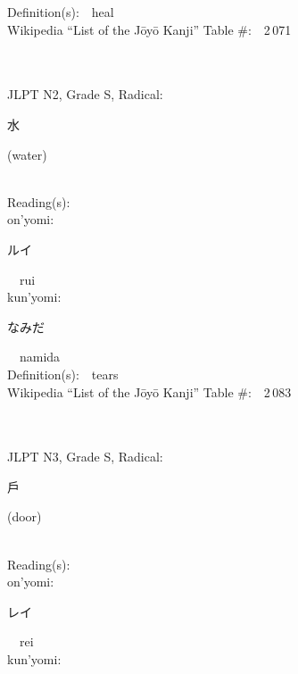 \begin{multicols}{2}
Definition(s):\ \ heal \\
Wikipedia ``List of the J\=oy\=o Kanji'' Table \#:\ \ 2\,071 \\
\ \ \\
{\fontsize{34pt}{40pt}  }\ \ \\  %
{JLPT N2, Grade S, Radical:\ \ {\begin{CJK}{UTF8}{min} 水 \end{CJK}} (water) } \\
Reading(s):\ \ \\
{\hspace*{1em}}on'yomi:\ \ \\
{\hspace*{2em}}{\begin{CJK}{UTF8}{min} ルイ \end{CJK}}\ \ rui\ \ \\
{\hspace*{1em}}kun'yomi:\ \ \\
{\hspace*{2em}}{\begin{CJK}{UTF8}{min} なみだ \end{CJK}}\ \ namida\ \ \\
Definition(s):\ \ tears \\
Wikipedia ``List of the J\=oy\=o Kanji'' Table \#:\ \ 2\,083 \\
\ \ \\
{\fontsize{34pt}{40pt}  }\ \ \\  %
{JLPT N3, Grade S, Radical:\ \ {\begin{CJK}{UTF8}{min} 戶 \end{CJK}} (door) } \\
Reading(s):\ \ \\
{\hspace*{1em}}on'yomi:\ \ \\
{\hspace*{2em}}{\begin{CJK}{UTF8}{min} レイ \end{CJK}}\ \ rei\ \ \\
{\hspace*{1em}}kun'yomi:\ \ \\

\end{multicols}
